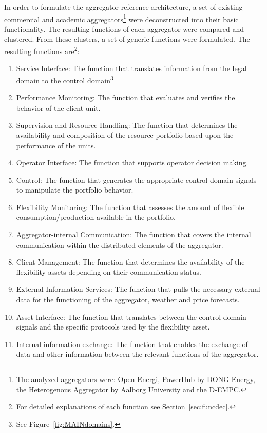In order to formulate the aggregator reference architecture, a set of existing commercial and academic aggregators\footnote{The analyzed aggregators were: Open Energi\cite{openenergi}, PowerHub by DONG Energy\cite{powerhub}, the Heterogenous Aggregator by Aalborg University\cite{rahnama2014evaluation} and the D-EMPC\cite{costanzo2013coordination}.}  were deconstructed into their basic functionality. The resulting functions of each aggregator were compared and clustered. From these clusters, a set of generic functions were formulated. The resulting functions are\footnote{For detailed explanations of each function see Section~\ref{sec:funcdec}.}:

\begin{enumerate}[label=\Alph*]
	\item Service Interface: The function that translates information from the legal domain to the control domain\footnote{See Figure~\ref{fig:MAINdomains}.}
	\item Performance Monitoring: The function that evaluates and verifies the behavior of the client unit.
	\item Supervision and Resource Handling: The function that determines the availability and composition of the resource portfolio based upon the performance of the units.
	\item Operator Interface: The function that supports operator decision making.
	\item Control: The function that generates the appropriate control domain signals to manipulate the portfolio behavior.
	\item Flexibility Monitoring: The function that assesses the amount of flexible consumption/production available in the portfolio.
	\item Aggregator-internal Communication: The function that covers the internal communication within the distributed elements of the aggregator.
	\item Client Management: The function that determines the availability of the flexibility assets depending on their communication status.
	\item External Information Services: The function that pulls the necessary external data for the functioning of the aggregator, \eg weather and price forecasts.
	\item Asset Interface: The function that translates between the control domain signals and the specific protocols used by the flexibility asset.
	\item Internal-information exchange: The function that enables the exchange of data and other information between the relevant functions of the aggregator.
\end{enumerate}

